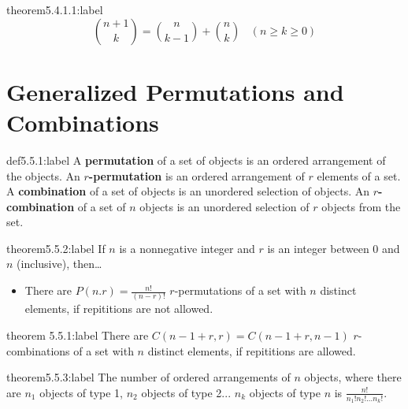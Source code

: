 \begin{theorem}{theorem5.4.1.1:label}
    \[
        \binom{n+1}{k} = \binom{n}{k-1} + \binom{n}{k} \:\:\:\: (n \ge k \ge 0)
    \]
\end{theorem}


\section{Generalized Permutations and Combinations}

\begin{definition}{def5.5.1:label}
    A \textbf{permutation} of a set of objects is an ordered arrangement of the objects. An \textbf{$r$-permutation} is an ordered arrangement of $r$ elements of a set. \\

    A \textbf{combination} of a set of objects is an unordered selection of objects. An \textbf{$r$-combination} of a set of $n$ objects is an unordered selection of $r$ objects from the set.
\end{definition}

\begin{theorem}{theorem5.5.2:label}
    If $n$ is a nonnegative integer and $r$ is an integer between 0 and $n$ (inclusive), then\dots

    \begin{itemize}
        \item There are $P(n.r)=\frac{n!}{(n-r)!}$ $r$-permutations of a set with $n$ distinct elements, if repititions are not allowed. 
    \end{itemize}
\end{theorem}

\begin{theorem}{theorem 5.5.1:label}
    There are $C(n-1+r,r)=C(n-1+r,n-1)$ $r$-combinations of a set with $n$ distinct elements, if repititions are allowed.
\end{theorem}

\begin{theorem}{theorem5.5.3:label}
    The number of ordered arrangements of $n$ objects, where there are $n_1$ objects of type 1, $n_2$ objects of type 2... $n_k$ objects of type $n$ is $\frac{n!}{n_1!n_2!...n_k!}$.
\end{theorem}